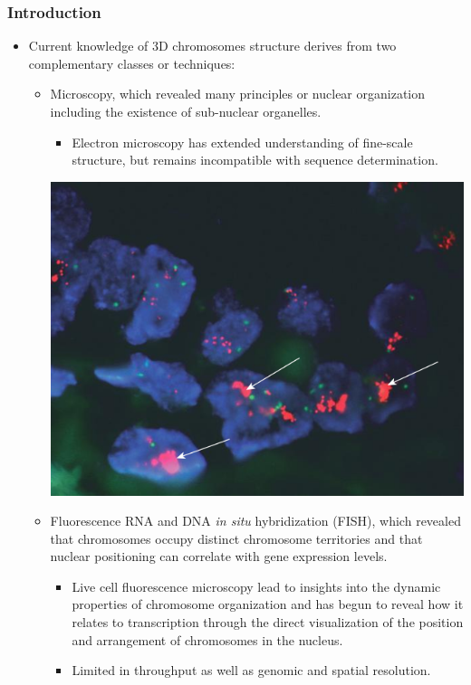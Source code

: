 \documentclass[plain,basic]{inVerba-notes}
\begin{document}
\subsubsection{Introduction}
\begin{itemize}
    \item Current knowledge of 3D chromosomes structure derives from two complementary classes or techniques:
    \begin{itemize}
        \item Microscopy, which revealed many principles or nuclear organization including the existence of sub-nuclear organelles.
            \begin{itemize}
                \item Electron microscopy has extended understanding of fine-scale structure, but remains incompatible with sequence determination.
            \end{itemize}
        \begin{center}
            \includegraphics[scale=0.3]{images/fish.png}
        \end{center}
        \item Fluorescence RNA and DNA \textit{in situ} hybridization (FISH), which revealed that chromosomes occupy distinct chromosome territories and that nuclear positioning can correlate with gene expression levels.
            \begin{itemize}
                \item Live cell fluorescence microscopy lead to insights into the dynamic properties of chromosome organization and has begun to reveal how it relates to transcription through the direct visualization of the position and arrangement of chromosomes in the nucleus. 
                \item Limited in throughput as well as genomic and spatial resolution.
            \end{itemize}
    \end{itemize}
    \vspace{20pt}


\end{itemize}
\end{document}

